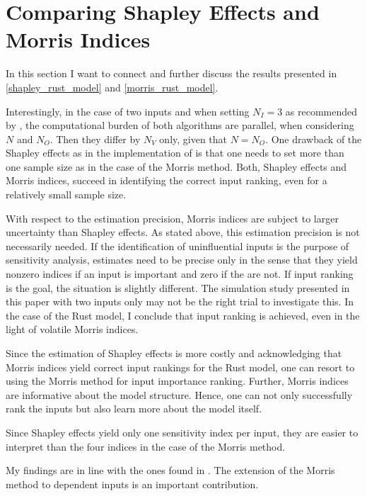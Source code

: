 \section{Comparing Shapley Effects and Morris Indices} \label{comparison}

In this section I want to connect and further discuss the results presented in \cref{shapley_rust_model}
and \cref{morris_rust_model}.

Interestingly, in the case of two inputs and when setting $N_I = 3$ as recommended
by \citet{SNS16}, the computational burden of both algorithms are parallel, when
considering $N$ and $N_O$. Then they differ by $N_V$ only, given that $N = N_O$. One drawback
of the Shapley effects as in the implementation of \citet{SNS16} is that one needs to
set more than one sample size as in the case of the Morris method.
Both, Shapley effects and Morris indices, succeed in identifying the correct input
ranking, even for a relatively small sample size.

With respect to the estimation precision, Morris indices are subject to larger uncertainty
than Shapley effects. As stated above, this estimation precision is not necessarily needed. If
the identification of uninfluential inputs is the purpose of sensitivity analysis, estimates need to be precise
only in the sense that they yield nonzero indices if an input is important and zero if the
are not. If input ranking is the goal, the situation is slightly different. The simulation
study presented in this paper with two inputs only may not be the right trial to investigate
this. In the case of the Rust model, I conclude that input ranking is achieved, even in the
light of volatile Morris indices.

Since the estimation of Shapley effects is more costly and acknowledging that Morris
indices yield correct input rankings for the Rust model, one can resort to using the Morris
method for input importance ranking. Further, Morris indices are informative about the
model structure. Hence, one can not only successfully rank the inputs but also learn more
about the model itself.

Since Shapley effects yield only one sensitivity index per input, they are easier to interpret than the four indices in the case of the Morris method.

My findings are in line with the ones found in \citet{GM17}. The extension of the Morris method to dependent inputs is an important contribution.